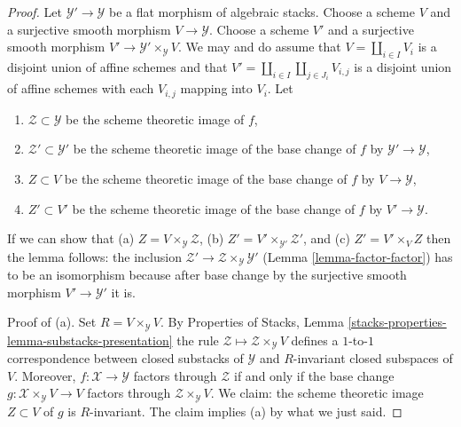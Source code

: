 \documentclass{stacks-project}
\theoremstyle{plain}
\theoremstyle{definition}
\theoremstyle{remark}
\numberwithin{equation}{subsection}
\begin{document}
\begin{proof}
Let $\mathcal{Y}' \to \mathcal{Y}$ be a flat morphism of algebraic stacks.
Choose a scheme $V$ and a surjective smooth morphism $V \to \mathcal{Y}$.
Choose a scheme $V'$ and a
surjective smooth morphism $V' \to \mathcal{Y}' \times_\mathcal{Y} V$.
We may and do assume that $V = \coprod_{i \in I} V_i$ is a disjoint
union of affine schemes and that
$V' = \coprod_{i \in I} \coprod_{j \in J_i} V_{i, j}$
is a disjoint union of affine schemes with each $V_{i, j}$ mapping into $V_i$.
Let
\begin{enumerate}
\item $\mathcal{Z} \subset \mathcal{Y}$ be the scheme theoretic image of $f$,
\item $\mathcal{Z}' \subset \mathcal{Y}'$ be the scheme theoretic image
of the base change of $f$ by $\mathcal{Y}' \to \mathcal{Y}$,
\item $Z \subset V$ be the scheme theoretic image
of the base change of $f$ by $V \to \mathcal{Y}$,
\item $Z' \subset V'$ be the scheme theoretic image
of the base change of $f$ by $V' \to \mathcal{Y}$.
\end{enumerate}
If we can show that
(a) $Z = V \times_\mathcal{Y} \mathcal{Z}$,
(b) $Z' = V' \times_{\mathcal{Y}'} \mathcal{Z}'$, and
(c) $Z' = V' \times_V Z$
then the lemma follows: the inclusion
$\mathcal{Z}' \to \mathcal{Z} \times_\mathcal{Y} \mathcal{Y}'$
(Lemma \ref{lemma-factor-factor})
has to be an isomorphism because after base change by the surjective
smooth morphism $V' \to \mathcal{Y}'$ it is.

\medskip\noindent
Proof of (a). Set $R = V \times_\mathcal{Y} V$.
By Properties of Stacks, Lemma
\ref{stacks-properties-lemma-substacks-presentation}
the rule $\mathcal{Z} \mapsto \mathcal{Z} \times_\mathcal{Y} V$
defines a $1$-to-$1$ correspondence between closed substacks
of $\mathcal{Y}$ and $R$-invariant closed subspaces of $V$.
Moreover, $f : \mathcal{X} \to \mathcal{Y}$ factors through $\mathcal{Z}$
if and only if the base change
$g : \mathcal{X} \times_\mathcal{Y} V \to V$ factors through
$\mathcal{Z} \times_\mathcal{Y} V$.
We claim: the scheme theoretic image $Z \subset V$ of $g$
is $R$-invariant. The claim implies (a) by what we just said.


\end{proof}
\end{document}
